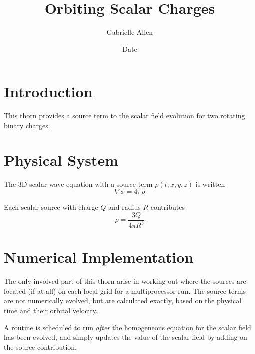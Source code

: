 \documentclass{article}
\begin{document}
\author{Gabrielle Allen} 

\title{Orbiting Scalar Charges}

\date{$ $Date$ $}


\maketitle



\begin{abstract}

\end{abstract}


\section{Introduction}

This thorn provides a source term to the scalar field evolution
for two rotating binary charges.


\section{Physical System}

The 3D scalar wave equation with a source term $\rho(t,x,y,z)$ is written
$$
\nabla \phi = 4 \pi \rho
$$

Each scalar source with charge $Q$ and radius $R$ contributes 
$$
\rho = \frac{3Q}{4\pi R^3}
$$

\section{Numerical Implementation}

The only involved part of this thorn arise in working out where the
sources are located (if at all) on each local grid for a multiprocessor
run. The source terms are not numerically evolved, but are calculated 
exactly, based on the physical time and their orbital velocity.

A routine is scheduled to run {\it after} the homogeneous equation
for the scalar field has been evolved, and simply updates the value
of the scalar field by adding on the source contribution.

\end{document}
